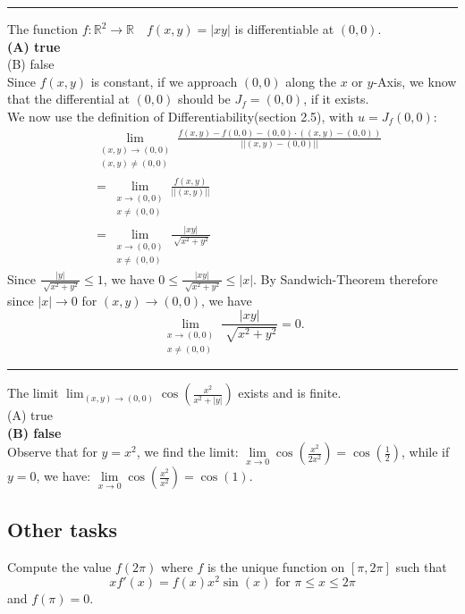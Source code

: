 \documentclass[a4paper,fontsize = 10pt]{article}
\def\R{\mathbb{R}}
\begin{document}
\vspace{0.1 cm}
\hrule
\vspace{0.2 cm}
The function $f: \R^2 \to \R \quad f(x,y) = |xy|$ is differentiable at $(0,0)$.
\\\textbf{(A) true}
\\(B) false
\\Since $f(x,y)$ is constant, if we approach $(0,0)$ along the $x$ or $y$-Axis, we know that the differential at $(0,0)$ should be $J_f = (0,0)$, if it exists.
\\We now use the definition of Differentiability(section 2.5), with $u = J_f(0,0)$:
\begin{align*}
  &\lim_{\substack{(x,y) \to (0,0) \\ (x,y) \neq (0,0)}} \frac{f(x,y)-f(0,0)-(0,0)\cdot((x,y)-(0,0))}{||(x,y)-(0,0)||}\\
  &= \lim_{\substack{x \to (0,0) \\ x \neq (0,0)}} \frac{f(x,y)}{||(x,y)||}\\
  &= \lim_{\substack{x \to (0,0) \\ x \neq (0,0)}} \frac{|xy|}{\sqrt[]{x^2+y^2}}
\end{align*}
Since $\frac{|y|}{\sqrt[]{x^2+y^2}} \leq 1$, we have $0 \leq\frac{|xy|}{\sqrt[]{x^2+y^2}} \leq |x|$. 
By Sandwich-Theorem therefore since $|x| \to 0$ for $(x,y) \to (0,0)$, we have 
\[\lim_{\substack{x \to (0,0) \\ x \neq (0,0)}} \frac{|xy|}{\sqrt[]{x^2+y^2}} = 0.\]
\vspace{0.1cm}
\hrule
\vspace{0.2cm}
The limit $\lim_{(x,y) \to (0,0)} \cos(\frac{x^2}{x^2 + |y|})$ exists and is finite.
\\(A) true
\\\textbf{(B) false}
\\Observe that for $y=x^2$, we find the limit: $\underset{x \to 0}{\lim} \cos \left ( \frac {x^2}{2x^2}\right ) = \cos \left ( \frac 1 2 \right )$, while if $y=0$, we have: $\underset{x \to 0}{\lim} \cos \left ( \frac {x^2}{x^2}\right ) = \cos (1)$.


\subsection{Other tasks}

Compute the value $f(2\pi)$ where $f$ is the unique function on $[\pi, 2\pi]$ such that 
\[xf'(x) = f(x) x^2\sin(x) \text{ for } \pi \leq x \leq 2\pi\]
and $f(\pi) = 0$.
\end{document}
